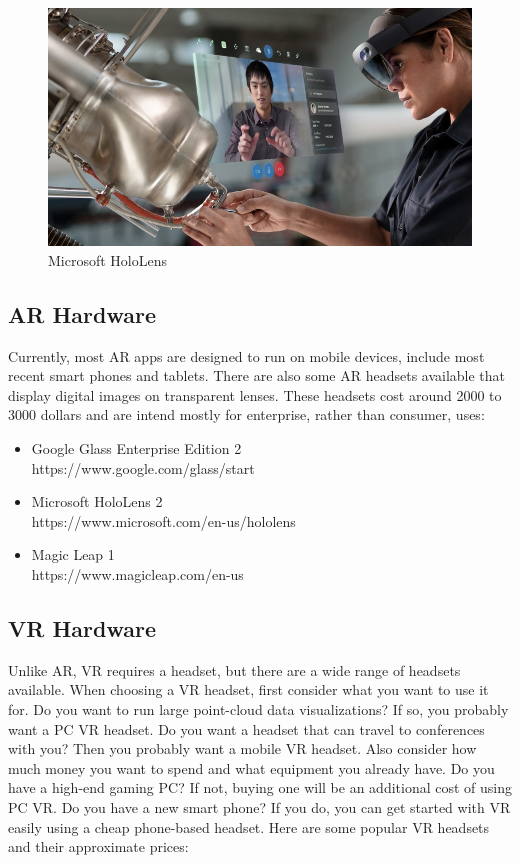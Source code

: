 \documentclass{article}
\begin{document}
\begin{figure}
\centering
\includegraphics[width=.6\textwidth]{hololens}
\caption{Microsoft HoloLens}
\end{figure}

\subsection{AR Hardware}
Currently, most AR apps are designed to run on mobile devices, include most recent smart phones and tablets. There are also some AR headsets available that display digital images on transparent lenses. These headsets cost around 2000 to 3000 dollars and are intend mostly for enterprise, rather than consumer, uses:
\begin{itemize}
    \item Google Glass Enterprise Edition 2\\
    https://www.google.com/glass/start
    \item Microsoft HoloLens 2\\
    https://www.microsoft.com/en-us/hololens
    \item Magic Leap 1\\
    https://www.magicleap.com/en-us
\end{itemize}

\subsection{VR Hardware}
Unlike AR, VR requires a headset, but there are a wide range of headsets available. When choosing a VR headset, first consider what you want to use it for. Do you want to run large point-cloud data visualizations? If so, you probably want a PC VR headset. Do you want a headset that can travel to conferences with you? Then you probably want a mobile VR headset. Also consider how much money you want to spend and what equipment you already have. Do you have a high-end gaming PC? If not, buying one will be an additional cost of using PC VR. Do you have a new smart phone? If you do, you can get started with VR easily using a cheap phone-based headset. Here are some popular VR headsets and their approximate prices:
\end{document}
